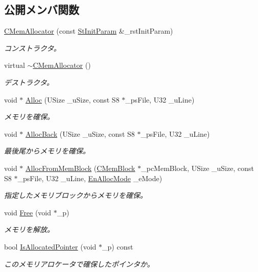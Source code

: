 \subsection*{公開メンバ関数}
\begin{DoxyCompactItemize}
\item 
\hyperlink{class_c_mem_allocator_a89a6785ad0679112693421390834c58a}{C\+Mem\+Allocator} (const \hyperlink{struct_c_mem_allocator_1_1_st_init_param}{St\+Init\+Param} \&\+\_\+rst\+Init\+Param)
\begin{DoxyCompactList}\small\item\em コンストラクタ。 \end{DoxyCompactList}\item 
virtual \hyperlink{class_c_mem_allocator_afcf3bf84876c42ab83cdc2ba10a7dac3}{$\sim$\+C\+Mem\+Allocator} ()
\begin{DoxyCompactList}\small\item\em デストラクタ。 \end{DoxyCompactList}\item 
void $\ast$ \hyperlink{class_c_mem_allocator_a65875035e030185e91391b1ce29eecdd}{Alloc} (U\+Size \+\_\+u\+Size, const S8 $\ast$\+\_\+ps\+File, U32 \+\_\+u\+Line)
\begin{DoxyCompactList}\small\item\em メモリを確保。 \end{DoxyCompactList}\item 
void $\ast$ \hyperlink{class_c_mem_allocator_a776e73bfdd517d758ccfe515298d6716}{Alloc\+Back} (U\+Size \+\_\+u\+Size, const S8 $\ast$\+\_\+ps\+File, U32 \+\_\+u\+Line)
\begin{DoxyCompactList}\small\item\em 最後尾からメモリを確保。 \end{DoxyCompactList}\item 
void $\ast$ \hyperlink{class_c_mem_allocator_a78bd707276d68fc2aa5828dbb86a74df}{Alloc\+From\+Mem\+Block} (\hyperlink{class_c_mem_block}{C\+Mem\+Block} $\ast$\+\_\+pc\+Mem\+Block, U\+Size \+\_\+u\+Size, const S8 $\ast$\+\_\+ps\+File, U32 \+\_\+u\+Line, \hyperlink{class_c_mem_allocator_abf840ff9239492607ab3a3b8e0df2066}{En\+Alloc\+Mode} \+\_\+e\+Mode)
\begin{DoxyCompactList}\small\item\em 指定したメモリブロックからメモリを確保。 \end{DoxyCompactList}\item 
void \hyperlink{class_c_mem_allocator_ac679b89a322afa320a994d8bedec415d}{Free} (void $\ast$\+\_\+p)
\begin{DoxyCompactList}\small\item\em メモリを解放。 \end{DoxyCompactList}\item 
bool \hyperlink{class_c_mem_allocator_ab3c38b86c68cfc86a3e95bb7964efd97}{Is\+Allocated\+Pointer} (void $\ast$\+\_\+p) const 
\begin{DoxyCompactList}\small\item\em このメモリアロケータで確保したポインタか。 \end{DoxyCompactList}\end{DoxyCompactItemize}
